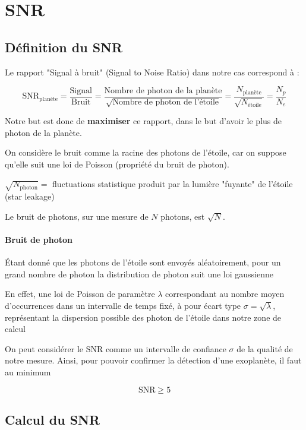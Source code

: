 \section{SNR}
\subsection{Définition du SNR}

Le rapport "Signal à bruit" (Signal to Noise Ratio) dans notre cas correspond à :

\[
\text{SNR}_\text{planète}=\frac{\text{Signal}}{\text{Bruit}}=\frac{\text{Nombre de photon de la planète}}{\sqrt{\text{Nombre de photon de l'étoile}}}=\frac{N_\text{planète}}{\sqrt{N_\text{étoile}}}=\frac{N_p}{N_e}
\]

Notre but est donc de \textbf{maximiser} ce rapport, dans le but d'avoir le plus de photon de la planète.

On considère le bruit comme la racine des photons de l'étoile, car on suppose qu'elle suit une loi de Poisson (propriété du bruit de photon).

$\sqrt{N_\text{photon}}=$ fluctuations statistique produit par la lumière "fuyante" de l'étoile (star leakage)

Le bruit de photons, sur une mesure de $N$ photons, est $\sqrt{N}$.



\paragraph{Bruit de photon} Étant donné que les photons de l'étoile sont envoyés aléatoirement, pour un grand nombre de photon la distribution de photon suit une loi gaussienne

En effet, une loi de Poisson de paramètre $\lambda$ correspondant au nombre moyen d'occurrences dans un intervalle de temps fixé, à pour écart type $\sigma = \sqrt{\lambda}$, représentant la dispersion possible des photon de l'étoile dans notre zone de calcul

On peut considérer le SNR comme un intervalle de confiance $\sigma$ de la qualité de notre mesure. Ainsi, pour pouvoir confirmer la détection d'une exoplanète, il faut au minimum 

\[
\text{SNR}\geq 5
\]

\subsection{Calcul du SNR}


